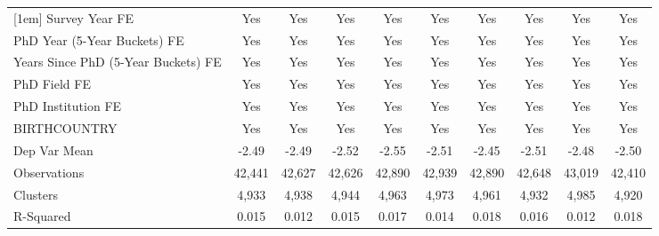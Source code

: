 \begin{table}[htbp]
\begin{tabular}{l*{9}{c}}
[1em]
Survey Year FE&         Yes         &         Yes         &         Yes         &         Yes         &         Yes         &         Yes         &         Yes         &         Yes         &         Yes         \\
[1em]
PhD Year (5-Year Buckets) FE&         Yes         &         Yes         &         Yes         &         Yes         &         Yes         &         Yes         &         Yes         &         Yes         &         Yes         \\
[1em]
Years Since PhD (5-Year Buckets) FE&         Yes         &         Yes         &         Yes         &         Yes         &         Yes         &         Yes         &         Yes         &         Yes         &         Yes         \\
[1em]
PhD Field FE&         Yes         &         Yes         &         Yes         &         Yes         &         Yes         &         Yes         &         Yes         &         Yes         &         Yes         \\
[1em]
PhD Institution FE&         Yes         &         Yes         &         Yes         &         Yes         &         Yes         &         Yes         &         Yes         &         Yes         &         Yes         \\
[1em]
BIRTHCOUNTRY&         Yes         &         Yes         &         Yes         &         Yes         &         Yes         &         Yes         &         Yes         &         Yes         &         Yes         \\
\hline
Dep Var Mean&       -2.49         &       -2.49         &       -2.52         &       -2.55         &       -2.51         &       -2.45         &       -2.51         &       -2.48         &       -2.50         \\
Observations&      42,441         &      42,627         &      42,626         &      42,890         &      42,939         &      42,890         &      42,648         &      43,019         &      42,410         \\
Clusters&       4,933         &       4,938         &       4,944         &       4,963         &       4,973         &       4,961         &       4,932         &       4,985         &       4,920         \\
R-Squared&       0.015         &       0.012         &       0.015         &       0.017         &       0.014         &       0.018         &       0.016         &       0.012         &       0.018         \\

\end{tabular}
\end{table}
